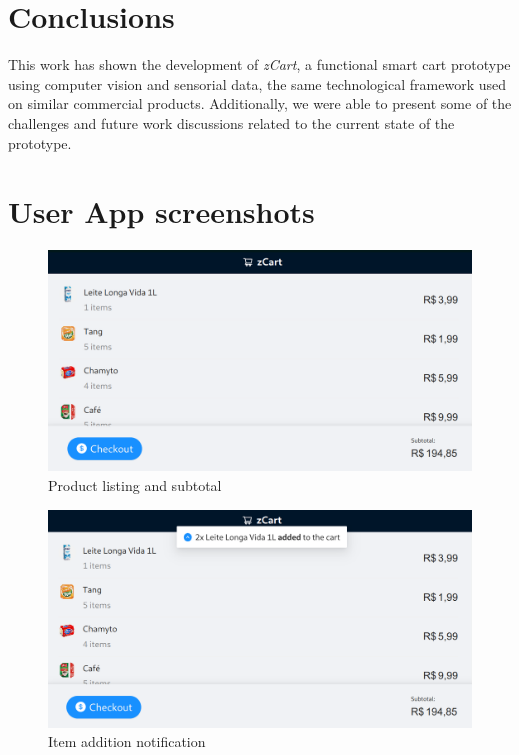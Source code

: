 \documentclass[openright]{normas-utf-tex} %
\begin{document}
\chapter{Conclusions}

This work has shown the development of \textit{zCart}, a functional smart cart
prototype using computer vision and sensorial data, the same technological
framework used on similar commercial products. Additionally, we were able to present
some of the challenges and future work discussions related to the current state
of the prototype.

\clearpage
\label{bibstart}

\label{bibend}

\apendice
\chapter{User App screenshots}
\label{ap:userapp}

\begin{figure}[H]
	\centering
	\includegraphics[width=1\textwidth]{./images/userapp.png}
	\caption[]{Product listing and subtotal}
\end{figure}

\begin{figure}[H]
	\centering
	\includegraphics[width=1\textwidth]{./images/userapp2.png}
	\caption[]{Item addition notification}
\end{figure}
\end{document}
